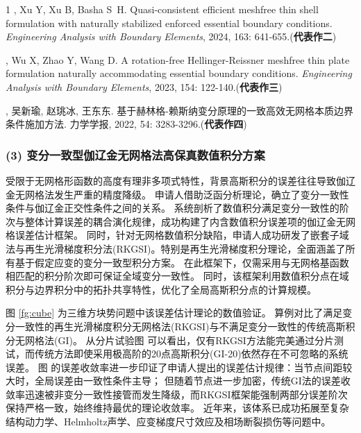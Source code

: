\vspace{-50pt}
\begin{thebibliography}{1}
	, Xu Y, Xu B, Basha S~H.
	\newblock Quasi-consistent efficient meshfree thin shell formulation with
	  naturally stabilized enforced essential boundary conditions.
	\newblock \emph{Engineering Analysis with Boundary Elements}, 2024, 163:
	  641-655.(\textbf{代表作二})

	, Wu X, Zhao Y, Wang D.
	\newblock A rotation-free {{Hellinger-Reissner}} meshfree thin plate
	  formulation naturally accommodating essential boundary conditions.
	\newblock \emph{Engineering Analysis with Boundary Elements}, 2023, 154:
	  122-140.(\textbf{代表作三})

	\textbf{}, 吴新瑜, 赵珧冰, 王东东.
	\newblock
	  {基于赫林格-赖斯纳变分原理的一致高效无网格本质边界条件施加方法}.
	\newblock 力学学报, 2022, 54: 3283-3296.(\textbf{代表作四})

\end{thebibliography}

\subsubsection*{\bfseries (3) 变分一致型伽辽金无网格法高保真数值积分方案}

受限于无网格形函数的高度有理非多项式特性，背景高斯积分的误差往往导致伽辽金无网格法发生严重的精度降级。
申请人借助泛函分析理论，确立了变分一致性条件与伽辽金正交性条件之间的关系。
系统剖析了数值积分满足变分一致性的阶次与整体计算误差的耦合演化规律，成功构建了内含数值积分误差项的伽辽金无网格误差估计框架。
同时，针对无网格数值积分缺陷，申请人成功研发了嵌套子域法与再生光滑梯度积分法(RKGSI)。特别是再生光滑梯度积分理论，全面涵盖了所有基于假定应变的变分一致型积分方案。
在此框架下，仅需采用与无网格基函数相匹配的积分阶次即可保证全域变分一致性。
同时，该框架利用数值积分点在域积分与边界积分中的拓扑共享特性，优化了全局高斯积分点的计算规模。

图 \ref{fg:cube} 为三维方块势问题中该误差估计理论的数值验证。
算例对比了满足变分一致性的再生光滑梯度积分无网格法(RKGSI)与不满足变分一致性的传统高斯积分无网格法(GI)。
从分片试验图  可以看出，仅有RKGSI方法能完美通过分片测试，而传统方法即使采用极高阶的20点高斯积分(GI-20)依然存在不可忽略的系统误差。
图  的误差收敛率进一步印证了申请人提出的误差估计规律：当节点间距较大时，全局误差由一致性条件主导；
但随着节点进一步加密，传统GI法的误差收敛率迅速被非变分一致性接管而发生降级，而RKGSI框架能强制两部分误差阶次保持严格一致，始终维持最优的理论收敛率。
近年来，该体系已成功拓展至复杂结构动力学、Helmholtz声学、应变梯度尺寸效应及相场断裂损伤等问题中。

